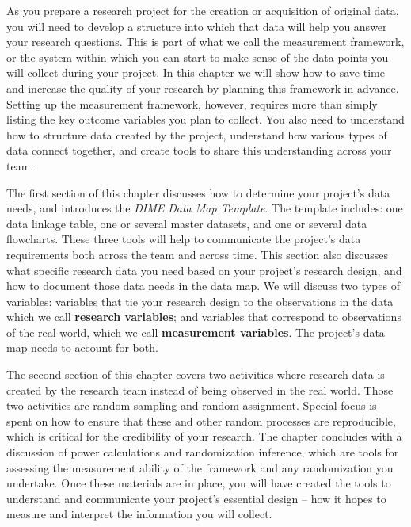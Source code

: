 
\begin{fullwidth}

As you prepare a research project for the creation or acquisition of original data,
you will need to develop a structure into which that data
will help you answer your research questions.
This is part of what we call the measurement framework,
or the system within which you can start to make sense
of the data points you will collect during your project.
In this chapter we will show how to save time
and increase the quality of your research by
planning this framework in advance.
Setting up the measurement framework, however, requires more than
simply listing the key outcome variables you plan to collect.
You also need to understand how to structure data created by the project,
understand how various types of data connect together,
and create tools to share this understanding across your team.

The first section of this chapter discusses how to
determine your project's data needs,
and introduces the \textit{DIME Data Map Template}.
The template includes:
one data linkage table,
one or several master datasets, and
one or several data flowcharts.
These three tools will help to communicate the project's data requirements
both across the team and across time.
This section also discusses what specific research data you need
based on your project's research design,
and how to document those data needs in the data map.
We will discuss two types of variables:
variables that tie your research design
to the observations in the  data
which we call \textbf{research variables};
and variables that correspond to observations of the real world,
which we call \textbf{measurement variables}.
The project's data map needs to account for both.

The second section of this chapter covers two activities where
research data is created by the research team
instead of being observed in the real world.
Those two activities are random sampling and random assignment.
Special focus is spent on how to ensure that
these and other random processes are reproducible,
which is critical for the credibility of your research.
The chapter concludes with a discussion of 
power calculations and randomization inference,
which are tools for assessing the measurement ability of
the framework and any randomization you undertake.
Once these materials are in place,
you will have created the tools to understand and communicate
your project's essential design --
how it hopes to measure and interpret the information you will collect.


\end{fullwidth}

